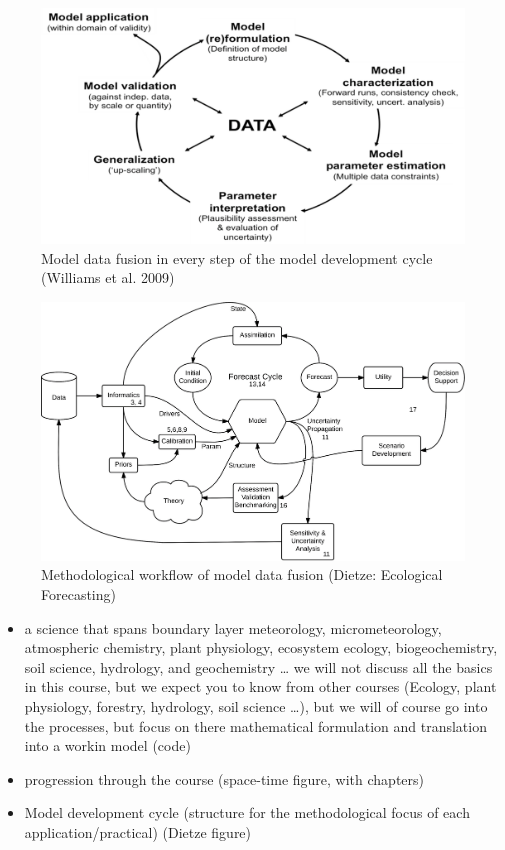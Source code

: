 \documentclass[
  oneside]{book}
\providecommand{\tightlist}{%
  \setlength{\itemsep}{0pt}\setlength{\parskip}{0pt}}
\begin{document}
\begin{figure}

{\centering \includegraphics[width=0.8\linewidth]{figures/chap1/williams_fusion} 

}

\caption{Model data fusion in every step of the model development cycle (Williams et al. 2009)}\label{fig:f13}
\end{figure}

\begin{figure}

{\centering \includegraphics[width=0.8\linewidth]{figures/chap1/dietze_workflow} 

}

\caption{Methodological workflow of model data fusion (Dietze: Ecological Forecasting)}\label{fig:f14}
\end{figure}

\begin{itemize}
\tightlist
\item
  a science that spans boundary layer meteorology, micrometeorology, atmospheric chemistry, plant physiology, ecosystem ecology, biogeochemistry, soil science, hydrology, and geochemistry \ldots{} we will not discuss all the basics in this course, but we expect you to know from other courses (Ecology, plant physiology, forestry, hydrology, soil science \ldots), but we will of course go into the processes, but focus on there mathematical formulation and translation into a workin model (code)
\item
  progression through the course (space-time figure, with chapters)
\item
  Model development cycle (structure for the methodological focus of each application/practical) (Dietze figure)
\end{itemize}
\end{document}

